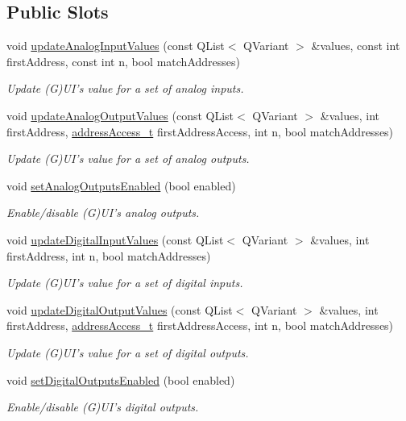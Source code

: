 \subsection*{Public Slots}
\begin{DoxyCompactItemize}
\item 
void \hyperlink{classmdt_device_ios_addeff0a2dab646a49170f8be10cc46fb}{update\-Analog\-Input\-Values} (const Q\-List$<$ Q\-Variant $>$ \&values, const int first\-Address, const int n, bool match\-Addresses)
\begin{DoxyCompactList}\small\item\em Update (G)U\-I's value for a set of analog inputs. \end{DoxyCompactList}\item 
void \hyperlink{classmdt_device_ios_a3aee92ecadda601d9482aeb6419f0bb8}{update\-Analog\-Output\-Values} (const Q\-List$<$ Q\-Variant $>$ \&values, int first\-Address, \hyperlink{classmdt_device_ios_a72fc3fdcd905d669b1e90496e808d6dd}{address\-Access\-\_\-t} first\-Address\-Access, int n, bool match\-Addresses)
\begin{DoxyCompactList}\small\item\em Update (G)U\-I's value for a set of analog outputs. \end{DoxyCompactList}\item 
void \hyperlink{classmdt_device_ios_ae266924a427fbc896e5f9774890ec91f}{set\-Analog\-Outputs\-Enabled} (bool enabled)
\begin{DoxyCompactList}\small\item\em Enable/disable (G)U\-I's analog outputs. \end{DoxyCompactList}\item 
void \hyperlink{classmdt_device_ios_ae994a3ef4d4f101ac185308e4afc05cb}{update\-Digital\-Input\-Values} (const Q\-List$<$ Q\-Variant $>$ \&values, int first\-Address, int n, bool match\-Addresses)
\begin{DoxyCompactList}\small\item\em Update (G)U\-I's value for a set of digital inputs. \end{DoxyCompactList}\item 
void \hyperlink{classmdt_device_ios_a06642814dbbb525dff7d1a7e603f57ac}{update\-Digital\-Output\-Values} (const Q\-List$<$ Q\-Variant $>$ \&values, int first\-Address, \hyperlink{classmdt_device_ios_a72fc3fdcd905d669b1e90496e808d6dd}{address\-Access\-\_\-t} first\-Address\-Access, int n, bool match\-Addresses)
\begin{DoxyCompactList}\small\item\em Update (G)U\-I's value for a set of digital outputs. \end{DoxyCompactList}\item 
void \hyperlink{classmdt_device_ios_ab1d98b31f7845c0015ac16728038d2db}{set\-Digital\-Outputs\-Enabled} (bool enabled)
\begin{DoxyCompactList}\small\item\em Enable/disable (G)U\-I's digital outputs. \end{DoxyCompactList}\end{DoxyCompactItemize}
